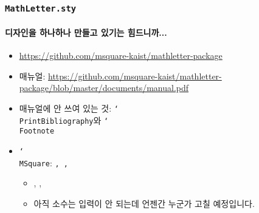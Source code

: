 \begin{frame}[fragile]
  \frametitle{\texttt{MathLetter.sty}}
  \framesubtitle{디자인을 하나하나 만들고 있기는 힘드니까...}
  \begin{itemize}
    \item \url{https://github.com/msquare-kaist/mathletter-package}
    \item 매뉴얼: \url{https://github.com/msquare-kaist/mathletter-package/blob/master/documents/manual.pdf}
    \item 매뉴얼에 안 쓰여 있는 것: \texttt{\char`\\PrintBibliography}와 \texttt{\char`\\Footnote}
    \item \texttt{\char`\\MSquare}: \texttt{\MSquare[1/2], \MSquare, \MSquare[2]}
    \begin{itemize}
    \item  \MSquare[1/2], \MSquare, \MSquare[2]
    \item 아직 소수는 입력이 안 되는데 언젠간 누군가 고칠 예정입니다.
    \end{itemize}
  \end{itemize}
\end{frame}
